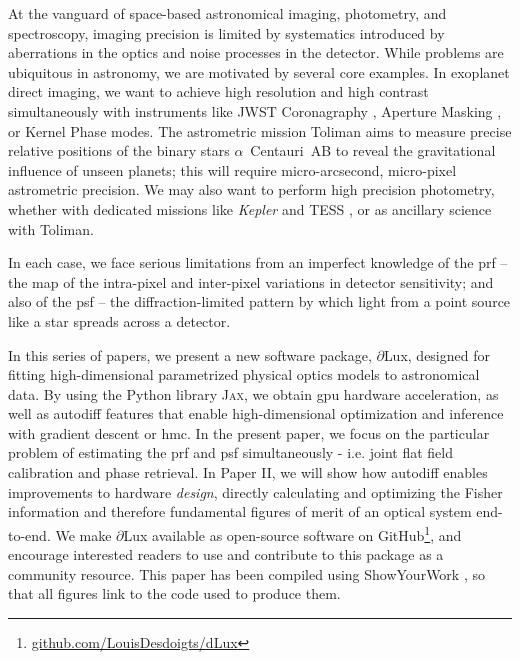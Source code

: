 \documentclass[]{spieman}
\newcommand\dlux{$\partial$Lux\xspace}
\begin{document}
At the vanguard of space-based astronomical imaging, photometry, and spectroscopy, imaging precision is limited by systematics introduced by aberrations in the optics and noise processes in the detector. While problems are ubiquitous in astronomy, we are motivated by several core examples. In exoplanet direct imaging, we want to achieve high resolution and high contrast simultaneously with instruments like JWST Coronagraphy \cite{Girard2022}, Aperture Masking \cite{Sivaramakrishnan2022}, or Kernel Phase \cite{Martinache2010,Kammerer2022} modes. The astrometric mission Toliman \cite{tuthill2018} aims to measure precise relative positions of the binary stars $\alpha$~Centauri~AB to reveal the gravitational influence of unseen planets; this will require micro-arcsecond, micro-pixel astrometric precision. We may also want to perform high precision photometry, whether with dedicated missions like \textit{Kepler} \cite{Borucki2010} and TESS \cite{Ricker2015}, or as ancillary science with Toliman. 

In each case, we face serious limitations from an imperfect knowledge of the \ac{prf} -- the map of the intra-pixel and inter-pixel variations in detector sensitivity; and also of the \ac{psf} -- the diffraction-limited pattern by which light from a point source like a star spreads across a detector.

In this series of papers, we present a new software package, \dlux, designed for fitting high-dimensional parametrized physical optics models to astronomical data. By using the Python library \textsc{Jax}\cite{jax}, we obtain \ac{gpu} hardware acceleration, as well as autodiff\cite{Margossian2018} features that enable high-dimensional optimization and inference with gradient descent or \ac{hmc}. In the present paper, we focus on the particular problem of estimating the \ac{prf} and \ac{psf} simultaneously - i.e. joint flat field calibration and phase retrieval. In Paper II, we will show how autodiff enables improvements to hardware \textit{design}, directly calculating and optimizing the Fisher information and therefore fundamental figures of merit of an optical system end-to-end. We make \dlux available as open-source software on GitHub\footnote{\href{https://github.com/LouisDesdoigts/dLux}{github.com/LouisDesdoigts/dLux}}, and encourage interested readers to use and contribute to this package as a community resource. This paper has been compiled using ShowYourWork \cite{Luger2021}, so that all figures link to the code used to produce them.
\end{document}
